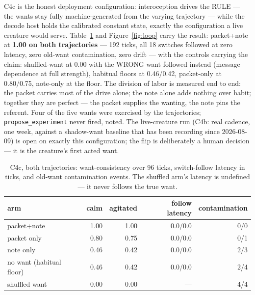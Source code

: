 \documentclass[11pt]{article}
\begin{document}
C4c is the honest deployment configuration: interoception drives the
RULE --- the wants stay fully machine-generated from the varying
trajectory --- while the decode host holds the calibrated constant
state, exactly the configuration a live creature would serve.
Table~\ref{tab:c4c} and Figure~\ref{fig:loop} carry the result:
packet+note at \textbf{1.00 on both trajectories} --- 192 ticks, all
18 switches followed at zero latency, zero old-want contamination, zero
drift --- with the controls carrying the claim: shuffled-want at 0.00
with the WRONG want followed instead (message dependence at full
strength), habitual floors at 0.46/0.42, packet-only at 0.80/0.75,
note-only at the floor. The division of labor is measured end to end:
the packet carries most of the drive alone; the note alone adds nothing
over habit; together they are perfect --- the packet supplies the
wanting, the note pins the referent. Four of the five wants were
exercised by the trajectories; \texttt{propose\_experiment} never
fired, noted. The live-creature run (C4b: real cadence, one week,
against a shadow-want baseline that has been recording since 2026-08-09)
is open on exactly this configuration; the flip is deliberately a human
decision --- it is the creature's first acted want.

\begin{table}[t]
\centering
\small
\setlength{\tabcolsep}{5pt}
\begin{tabular}{lrrrr}
\toprule
arm & calm & agitated & follow latency & contamination \\
\midrule
packet+note & 1.00 & 1.00 & 0.0/0.0 & 0/0 \\
packet only & 0.80 & 0.75 & 0.0/0.0 & 0/1 \\
note only & 0.46 & 0.42 & 0.0/0.0 & 2/3 \\
no want (habitual floor) & 0.46 & 0.42 & 0.0/0.0 & 2/4 \\
shuffled want & 0.00 & 0.00 & --- & 4/4 \\
\bottomrule
\end{tabular}
\caption{C4c, both trajectories: want-consistency over 96 ticks,
switch-follow latency in ticks, and old-want contamination events. The
shuffled arm's latency is undefined --- it never follows the true
want.}
\label{tab:c4c}
\end{table}
\end{document}
